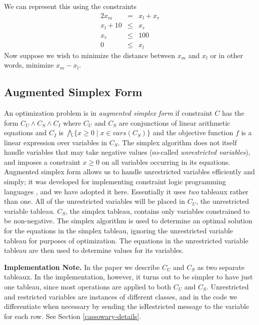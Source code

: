 \documentclass{article}
\begin{document}
We can represent this using the constraints
$$\begin{array}{rcl}
2 x_m &=& x_l + x_r \\
x_l + 10 &\leq &x_r \\
x_r &\leq& 100 \\
0 &\leq& x_l
\end{array}$$
Now suppose  we wish to minimize the distance between
$x_m$ and $x_l$ or in other words, minimize $x_m - x_l$.

\subsection{Augmented Simplex Form}
\label{augmented-simplex-form}

An optimization problem is in \emph{augmented simplex form} if constraint
$C$ has the form $C_U \wedge C_S \wedge C_I$ where $C_U$ and $C_S$ are
conjunctions of linear arithmetic equations and $C_I$ is $\bigwedge \{ x
\geq 0 \mid x \in vars(C_S)\}$ and the objective function $f$ is a linear
expression over variables in $C_S$\@.  The simplex algorithm does not itself
handle variables that may take negative values (so-called
\emph{unrestricted variables}), and imposes a constraint $x \geq 0$ on all
variables occurring in its equations.  Augmented simplex form allows us to
handle unrestricted variables efficiently and simply; it was developed for
implementing constraint logic programming languages
\cite{marriott-stuckey-book}, and we have adopted it here.  Essentially it
uses \emph{two} tableaux rather than one.  All of the unrestricted
variables will be placed in $C_U$, the unrestricted variable tableau.
$C_S$, the simplex tableau, contains only variables constrained to be
non-negative.  The simplex algorithm is used to determine an optimal
solution for the equations in the simplex tableau, ignoring the
unrestricted variable tableau for purposes of optimization.  The equations
in the unrestricted variable tableau are then used to determine values for
its variables.

{\bf Implementation Note.}  In the paper we describe $C_U$ and $C_S$ as
two separate tableaux.  In the implementation, however, it turns out to be
simpler to have just one tableau, since most operations are applied to both
$C_U$ and $C_S$.  Unrestricted and restricted variables are instances of
different classes, and in the code
we differentiate when necessary by sending the {\sf
isRestricted} message to the variable for each row.  See Section
\ref{cassowary-details}.
\end{document}
